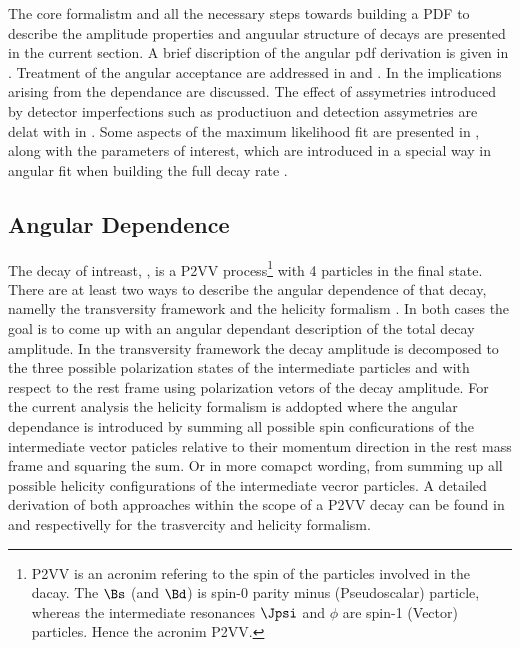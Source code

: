 
The core formalistm and all the necessary steps towards building a PDF to describe the amplitude properties and anguular structure of \BJpsiKst decays are presented in
the current section. A brief discription of the angular pdf derivation is given in .
Treatment of the angular acceptance are addressed in  and .
In  the implications arising from the \mkpi dependance are discussed.
The effect of assymetries introduced by detector imperfections such as productiuon and detection assymetries are delat with
in . Some aspects of the maximum likelihood fit are presented in ,
along with the \ACP parameters of interest, which are introduced in a special way in angular fit when building the full decay rate \pdf.


\subsection{Angular Dependence}
\label{Diferential_Decay_Rate}
The decay of intreast, \BJpsiKst, is a P2VV 
process\footnote{P2VV is an acronim refering to the spin of the particles involved in the dacay.
The $\Bs$ (and $\Bd$) is spin-0 parity minus (Pseudoscalar) particle, whereas the intermediate resonances $\Jpsi$ and $\phi$ 
are spin-1 (Vector) particles. Hence the acronim P2VV.}
with 4 particles in the final state. There are at least two ways to describe the angular dependence of that decay, namelly the transversity framework \cite{transvFrameworkI,transvFrameworkII}
and the helicity formalism \cite{helicityFormI,helicityFormII}. In both cases the goal is to come up with an angular dependant description of the total decay amplitude.
In the transversity framework the decay amplitude is decomposed to the three possible polarization states of the intermediate particles \Jpsi and \Kst with respect to 
the \Bs rest frame using polarization vetors of the decay amplitude. For the current analysis the helicity formalism is addopted where the angular dependance is 
introduced by summing all possible spin conficurations of the intermediate vector paticles relative to their momentum direction in the \Bs rest mass frame
and squaring the sum. Or in more comapct wording, from summing up all possible helicity configurations of the intermediate vecror particles. A detailed derivation of both 
approaches within the scope of a P2VV decay can be found in \cite{daanThesis} and \cite{jeroenThesis} respectivelly for the trasvercity and helicity formalism.

